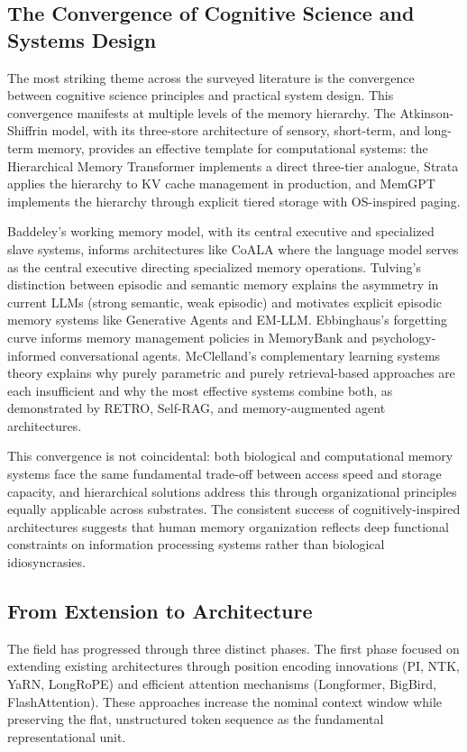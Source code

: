 \documentclass[11pt,letterpaper]{article}
\begin{document}
\subsection{The Convergence of Cognitive Science and Systems Design}

The most striking theme across the surveyed literature is the convergence between cognitive science principles and practical system design. This convergence manifests at multiple levels of the memory hierarchy. The Atkinson-Shiffrin model, with its three-store architecture of sensory, short-term, and long-term memory, provides an effective template for computational systems: the Hierarchical Memory Transformer implements a direct three-tier analogue, Strata applies the hierarchy to KV cache management in production, and MemGPT implements the hierarchy through explicit tiered storage with OS-inspired paging.

Baddeley's working memory model, with its central executive and specialized slave systems, informs architectures like CoALA where the language model serves as the central executive directing specialized memory operations. Tulving's distinction between episodic and semantic memory explains the asymmetry in current LLMs (strong semantic, weak episodic) and motivates explicit episodic memory systems like Generative Agents and EM-LLM. Ebbinghaus's forgetting curve informs memory management policies in MemoryBank and psychology-informed conversational agents. McClelland's complementary learning systems theory explains why purely parametric and purely retrieval-based approaches are each insufficient and why the most effective systems combine both, as demonstrated by RETRO, Self-RAG, and memory-augmented agent architectures.

This convergence is not coincidental: both biological and computational memory systems face the same fundamental trade-off between access speed and storage capacity, and hierarchical solutions address this through organizational principles equally applicable across substrates. The consistent success of cognitively-inspired architectures suggests that human memory organization reflects deep functional constraints on information processing systems rather than biological idiosyncrasies.

\subsection{From Extension to Architecture}

The field has progressed through three distinct phases. The first phase focused on extending existing architectures through position encoding innovations (PI, NTK, YaRN, LongRoPE) and efficient attention mechanisms (Longformer, BigBird, FlashAttention). These approaches increase the nominal context window while preserving the flat, unstructured token sequence as the fundamental representational unit.
\end{document}
